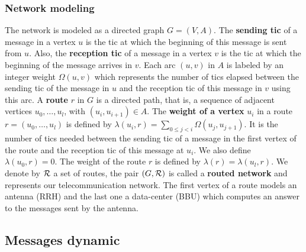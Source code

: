 \documentclass[french]{article}
\begin{document}
  \subsubsection{Network modeling}
  
The network is modeled as a directed graph $G=(V,A)$. The \textbf{sending tic} of a message in a vertex $u$ is the tic at which the beginning of this message is sent from $u$. Also, the \textbf{reception tic} of a message in a vertex $v$ is the tic at which the beginning of the message arrives in $v$.  Each arc  $(u,v)$ in $A$ is labeled by an integer weight $\Omega(u,v)$ which represents the number of tics elapsed between the sending tic of the message in $u$ and the reception tic of this message in $v$ using this arc. A {\bf route} $r$ in $G$ is a directed path, that is, a sequence of adjacent vertices $u_0, \ldots , u_{l}$, with $(u_i,u_{i+1}) \in A$.  The {\bf weight of a vertex} $u_i$ in a route $r=(u_0,\dots,u_l)$ is defined by $\lambda(u_i,r)= \sum\limits_{0 \leq j <i} \Omega(u_j, u_{j+1})$. It is the number of tics needed between the sending tic of a message in the first vertex of the route and the reception tic of this message at $u_i$. We also define $\lambda(u_0,r)=0$. The weight of the route $r$ is defined by $\lambda (r)= \lambda (u_l,r)$.
We denote by $\cal R$ a set of routes, the pair $(G,\cal R)$ is called a {\bf routed network} and represents our telecommunication network.
The first vertex of a route models an antenna (RRH) and the last one a data-center (BBU) which computes an answer to the messages sent by the antenna.
 \subsection{Messages dynamic}
	 
    
\end{document}
